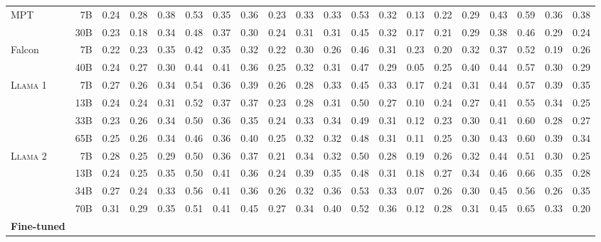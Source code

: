 \documentclass{article}
\newcommand{\anise}{\textsc{Llama 1}\xspace}
\newcommand{\cinnamon}{\textsc{Llama 2}\xspace}
\begin{document}
\begin{table}[htbp]
{\begin{tabular}{@{}lrrrrrrrrrrrrrrrrrrr@{}}
 \midrule
\multirow{2}{*}{MPT} & 7B & 0.24 & 0.28 & 0.38 & 0.53 & 0.35 & 0.36 & 0.23 & 0.33 & 0.33 & 0.53 & 0.32 & 0.13 & 0.22 & 0.29 & 0.43 & 0.59 & 0.36 & 0.38 \\
 & 30B & 0.23 & 0.18 & 0.34 & 0.48 & 0.37 & 0.30 & 0.24 & 0.31 & 0.31 & 0.45 & 0.32 & 0.17 & 0.21 & 0.29 & 0.38 & 0.46 & 0.29 & 0.24 \\
  \midrule
\multirow{2}{*}{Falcon} & 7B & 0.22 & 0.23 & 0.35 & 0.42 & 0.35 & 0.32 & 0.22 & 0.30 & 0.26 & 0.46 & 0.31 & 0.23 & 0.20 & 0.32 & 0.37 & 0.52 & 0.19 & 0.26 \\
 & 40B & 0.24 & 0.27 & 0.30 & 0.44 & 0.41 & 0.36 & 0.25 & 0.32 & 0.31 & 0.47 & 0.29 & 0.05 & 0.25 & 0.40 & 0.44 & 0.57 & 0.30 & 0.29 \\
  \midrule
\multirow{4}{*}{\anise} & 7B & 0.27 & 0.26 & 0.34 & 0.54 & 0.36 & 0.39 & 0.26 & 0.28 & 0.33 & 0.45 & 0.33 & 0.17 & 0.24 & 0.31 & 0.44 & 0.57 & 0.39 & 0.35 \\
 & 13B & 0.24 & 0.24 & 0.31 & 0.52 & 0.37 & 0.37 & 0.23 & 0.28 & 0.31 & 0.50 & 0.27 & 0.10 & 0.24 & 0.27 & 0.41 & 0.55 & 0.34 & 0.25 \\
 & 33B & 0.23 & 0.26 & 0.34 & 0.50 & 0.36 & 0.35 & 0.24 & 0.33 & 0.34 & 0.49 & 0.31 & 0.12 & 0.23 & 0.30 & 0.41 & 0.60 & 0.28 & 0.27 \\
 & 65B & 0.25 & 0.26 & 0.34 & 0.46 & 0.36 & 0.40 & 0.25 & 0.32 & 0.32 & 0.48 & 0.31 & 0.11 & 0.25 & 0.30 & 0.43 & 0.60 & 0.39 & 0.34 \\
  \midrule
\multirow{4}{*}{\cinnamon} & 7B & 0.28 & 0.25 & 0.29 & 0.50 & 0.36 & 0.37 & 0.21 & 0.34 & 0.32 & 0.50 & 0.28 & 0.19 & 0.26 & 0.32 & 0.44 & 0.51 & 0.30 & 0.25 \\
 & 13B & 0.24 & 0.25 & 0.35 & 0.50 & 0.41 & 0.36 & 0.24 & 0.39 & 0.35 & 0.48 & 0.31 & 0.18 & 0.27 & 0.34 & 0.46 & 0.66 & 0.35 & 0.28 \\
 & 34B & 0.27 & 0.24 & 0.33 & 0.56 & 0.41 & 0.36 & 0.26 & 0.32 & 0.36 & 0.53 & 0.33 & 0.07 & 0.26 & 0.30 & 0.45 & 0.56 & 0.26 & 0.35 \\
 & 70B & 0.31 & 0.29 & 0.35 & 0.51 & 0.41 & 0.45 & 0.27 & 0.34 & 0.40 & 0.52 & 0.36 & 0.12 & 0.28 & 0.31 & 0.45 & 0.65 & 0.33 & 0.20 \\
  \midrule
   \midrule
\textbf{Fine-tuned} &  & \multicolumn{1}{l}{} & \multicolumn{1}{l}{} & \multicolumn{1}{l}{} & \multicolumn{1}{l}{} & \multicolumn{1}{l}{} & \multicolumn{1}{l}{} & \multicolumn{1}{l}{} & \multicolumn{1}{l}{} & \multicolumn{1}{l}{} & \multicolumn{1}{l}{} & \multicolumn{1}{l}{} & \multicolumn{1}{l}{} & \multicolumn{1}{l}{} & \multicolumn{1}{l}{} & \multicolumn{1}{l}{} & \multicolumn{1}{l}{} & \multicolumn{1}{l}{} & \multicolumn{1}{l}{} \\

\end{tabular}}
\end{table}
\end{document}
